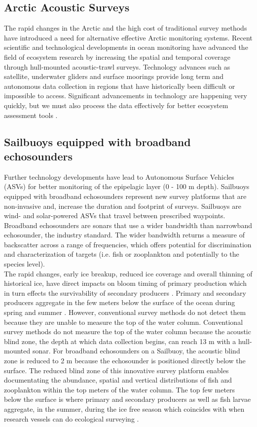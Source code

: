 \documentclass[a4paper, 12pt, Ariel]{article}
\begin{document}
\subsection{Arctic Acoustic Surveys}
The rapid changes in the Arctic and the high cost of traditional survey methods have introduced a need for alternative effective Arctic monitoring systems. Recent scientific and technological developments in ocean monitoring have advanced the field of ecosystem research by increasing the spatial and temporal coverage through hull-mounted acoustic-trawl surveys. Technology advances such as satellite, underwater gliders and surface moorings provide long term and autonomous data collection in regions that have historically been difficult or impossible to access. Significant advancements in technology are happening very quickly, but we must also process the data effectively for better ecosystem assessment tools \cite{Cross2015}.\\

\subsection{Sailbuoys equipped with broadband echosounders}
Further technology developments have lead to Autonomous Surface Vehicles (ASVs) for better monitoring of the epipelagic layer (0 - 100 m depth). Sailbuoys equipped with broadband echosounders represent new survey platforms that are non-invasive and, increase the duration and footprint of surveys. Sailbuoys are wind- and solar-powered ASVs that travel between prescribed waypoints. Broadband echosounders are sonars that use a wider bandwidth than narrowband echosounder, the industry standard. The wider bandwidth returns a measure of backscatter across a range of frequencies, which offers potential for discrimination and characterization of targets (i.e. fish or zooplankton and potentially to the species level). \\

The rapid changes, early ice breakup, reduced ice coverage and overall thinning of historical ice, have direct impacts on bloom timing of primary production which in turn effects the survivability of secondary producers \cite{Ringuette2002}. Primary and secondary producers aggregate in the few meters below the surface of the ocean during spring and summer \cite{Basedow2016}. However, conventional survey methods do not detect them because they are unable to measure the top of the water column. Conventional survey methods do not measure the top of the water column because the acoustic blind zone, the depth at which data collection begins, can reach 13 m with a hull-mounted sonar. For broadband echosounders on a Sailbuoy, the acoustic blind zone is reduced to 2 m because the echosounder is positioned directly below the surface. The reduced blind zone of this innovative survey platform enables documentating the abundance, spatial and vertical distributions of fish and zooplankton within the top meters of the water column. The top few meters below the surface is where primary and secondary producers as well as fish larvae aggregate, in the summer, during the ice free season which coincides with when research vessels can do ecological surveying . \\
\end{document}
